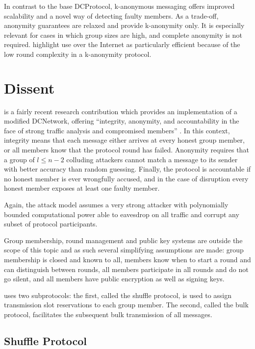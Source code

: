 In contrast to the base \ac{DCProtocol}, k-anonymous messaging offers improved scalability and
a novel way of detecting faulty members. As a trade-off, anonymity guarantees are relaxed
and provide k-anonymity only. It is especially relevant for cases in which group sizes are high,
and complete anonymity is not required. \citeauthor{von2003k} highlight use over the
Internet as particularly efficient because of the low round complexity in a k-anonymity protocol.

\section{Dissent} \label{sec:dissent}

\Dissent is a fairly recent research contribution which provides an implementation of a modified \ac{DCNetwork},
offering ``integrity, anonymity, and accountability in the face of strong traffic analysis and compromised members'' \cite{journals/corr/abs-1004-3057}. In this context, integrity means that each message either
arrives at every honest group member, or all members know that the protocol round has failed. Anonymity
requires that a group of $l \leq n - 2$ colluding attackers cannot match a message to its sender
with better accuracy than random guessing. Finally, the protocol is accountable if no honest member is
ever wrongfully accused, and in the case of disruption every honest member exposes at least one faulty member.


Again, the attack model assumes a very strong attacker with polynomially bounded computational
power able to eavesdrop on all traffic and corrupt any subset of protocol participants.

Group membership, round management and public key systems are outside
the scope of this topic and as such several simplifying assumptions are made: group membership is closed
and known to all, members
know when to start a round and can distinguish between rounds, all members participate in all rounds
and do not go silent, and all members have public encryption as well as signing keys.

\Dissent uses two subprotocols: the first, called the shuffle protocol, is used to assign
transmission slot reservations to each group member. The second, called the bulk protocol,
facilitates the subsequent bulk transmission of all messages.

\subsection{Shuffle Protocol}

